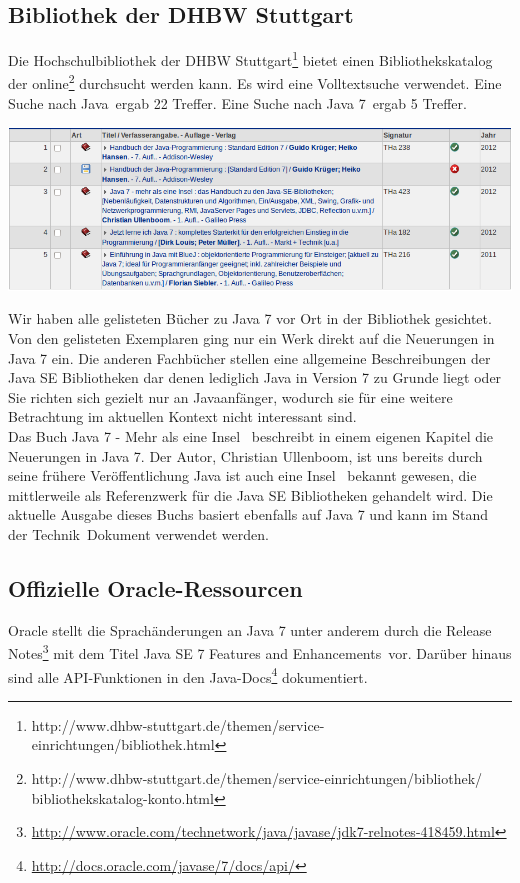 \label{startdetails}
\subsection{Bibliothek der DHBW Stuttgart}
Die Hochschulbibliothek der DHBW Stuttgart\footnote{http://www.dhbw-stuttgart.de/themen/service-einrichtungen/bibliothek.html} bietet einen Bibliothekskatalog der online\footnote{http://www.dhbw-stuttgart.de/themen/service-einrichtungen/bibliothek/\\bibliothekskatalog-konto.html} durchsucht werden kann. Es wird eine Volltextsuche verwendet. Eine Suche nach \glqq Java\grqq ~ergab 22 Treffer. Eine Suche nach \glqq Java 7\grqq ~ergab 5 Treffer.

\begin{center}
\includegraphics[width=\textwidth]{images/dhbw-lib-search-results.png}
\end{center}

Wir haben alle gelisteten Bücher zu Java 7 vor Ort in der Bibliothek gesichtet. Von den gelisteten Exemplaren ging nur ein Werk\cite{javainsel2} direkt auf die Neuerungen in Java 7 ein. Die anderen Fachbücher stellen eine allgemeine Beschreibungen der Java SE Bibliotheken dar denen lediglich Java in Version 7 zu Grunde liegt\cite{dhLibHandbuchJava} oder Sie richten sich gezielt nur an Javaanfänger\cite{dhLibJetztJavaLernen}\cite{dhLibBlueJStart}, wodurch sie für eine weitere Betrachtung im aktuellen Kontext nicht interessant sind.\\

Das Buch \glqq Java 7 - Mehr als eine Insel\grqq\cite{javainsel2} ~beschreibt in einem eigenen Kapitel die Neuerungen in Java 7. Der Autor, Christian Ullenboom, ist uns bereits durch seine frühere Veröffentlichung \glqq Java ist auch eine Insel\grqq\cite{javainsel1} ~bekannt gewesen, die mittlerweile als Referenzwerk für die Java SE Bibliotheken gehandelt wird. Die aktuelle Ausgabe dieses Buchs basiert ebenfalls auf Java 7 und kann im \glqq Stand der Technik\grqq ~Dokument verwendet werden.

\subsection{Offizielle Oracle-Ressourcen}\label{oracle}
Oracle stellt die Sprachänderungen an Java 7 unter anderem durch die Release
Notes\footnote{\url{http://www.oracle.com/technetwork/java/javase/jdk7-relnotes-418459.html}} mit dem Titel 
\glqq Java SE 7 Features and Enhancements\grqq\cite{oracleJavaRel}~vor. Darüber hinaus sind alle API-Funktionen in den 
Java-Docs\footnote{\url{http://docs.oracle.com/javase/7/docs/api/}}\cite{javadocs} dokumentiert.\\

